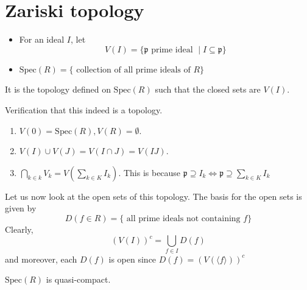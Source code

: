 \documentclass[oneside, 12pt]{scrbook}
\theoremstyle{theorem}
\begin{document}
\section{Zariski topology}

\begin{definition}
\begin{itemize}
\item For an ideal $I$, let $$V(I) = \{\mathfrak{p} \text{ prime ideal }\mid I \subseteq \mathfrak{p}\}$$
\item $\mathrm{Spec}(R)=\{ \text{ collection of all prime ideals of }R\}$
\end{itemize}
\end{definition}

\begin{definition}
It is the topology defined on $\mathrm{Spec}(R)$ such that the closed sets are $V(I)$.
\end{definition}

Verification that this indeed is a topology. 
\begin{enumerate}
\item $V(0) = \mathrm{Spec}(R), V(R) = \emptyset$.
\item $V(I) \cup V(J) = V(I\cap J) = V(IJ)$.
\item $\bigcap_{k \in k} V_{k} = V(\sum_{k \in K} I_{k})$. This is because $\mathfrak{p} \supseteq I_{k} \Leftrightarrow \mathfrak{p} \supseteq \sum_{k \in K}I_{k}$
\end{enumerate}

Let us now look at the open sets of this topology. The basis for the open sets is given by $$D(f \in R) = \{ \text{ all prime ideals not containing } f\}$$
Clearly, $$(V(I))^c = \bigcup_{f \in I} D(f)$$ and moreover, each $D(f)$ is open since $D(f) = (V(\langle f \rangle))^c$

\begin{theorem}
$\mathrm{Spec}(R)$ is quasi-compact.
\end{theorem}
\end{document}
